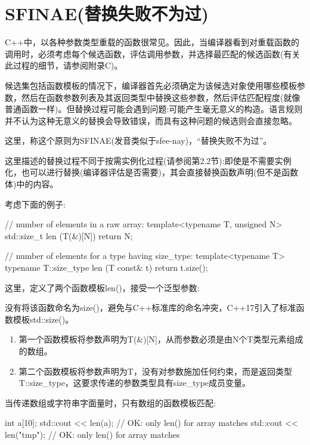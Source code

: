 \section{SFINAE(替换失败不为过)}

C++中，以各种参数类型重载的函数很常见。因此，当编译器看到对重载函数的调用时，必须考虑每个候选函数，评估调用参数，并选择最匹配的候选函数(有关此过程的细节，请参阅附录C)。

候选集包括函数模板的情况下，编译器首先必须确定为该候选对象使用哪些模板参数，然后在函数参数列表及其返回类型中替换这些参数，然后评估匹配程度(就像普通函数一样)。但替换过程可能会遇到问题:可能产生毫无意义的构造。语言规则并不认为这种无意义的替换会导致错误，而具有这种问题的候选则会直接忽略。

这里，称这个原则为SFINAE(发音类似于sfee-nay)，“替换失败不为过”。

这里描述的替换过程不同于按需实例化过程(请参阅第2.2节):即使是不需要实例化，也可以进行替换(编译器评估是否需要)，其会直接替换函数声明(但不是函数体)中的内容。

考虑下面的例子:

\begin{cpp}
// number of elements in a raw array:
template<typename T, unsigned N>
std::size_t len (T(&)[N])
{
	return N;
}

// number of elements for a type having size_type:
template<typename T>
typename T::size_type len (T const& t)
{
	return t.size();
}
\end{cpp}

这里，定义了两个函数模板len()，接受一个泛型参数:

\begin{notice}
没有将该函数命名为size()，避免与C++标准库的命名冲突，C++17引入了标准函数模板std::size()。
\end{notice}

\begin{enumerate}
\item 
第一个函数模板将参数声明为T(\&)[N]，从而参数必须是由N个T类型元素组成的数组。

\item 
第二个函数模板将参数声明为T，没有对参数施加任何约束，而是返回类型T::size\_type，这要求传递的参数类型具有size\_type成员变量。
\end{enumerate}

当传递数组或字符串字面量时，只有数组的函数模板匹配:

\begin{cpp}
int a[10];
std::cout << len(a); // OK: only len() for array matches
std::cout << len("tmp"); // OK: only len() for array matches
\end{cpp}

